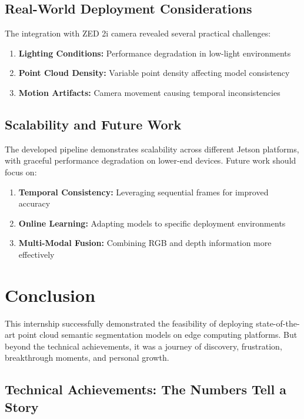 \documentclass[12pt,a4paper]{report}
\begin{document}
\section{Real-World Deployment Considerations}

The integration with ZED 2i camera revealed several practical challenges:

\begin{enumerate}
    \item \textbf{Lighting Conditions:} Performance degradation in low-light environments
    \item \textbf{Point Cloud Density:} Variable point density affecting model consistency
    \item \textbf{Motion Artifacts:} Camera movement causing temporal inconsistencies
\end{enumerate}

\section{Scalability and Future Work}

The developed pipeline demonstrates scalability across different Jetson platforms, with graceful performance degradation on lower-end devices. Future work should focus on:

\begin{enumerate}
    \item \textbf{Temporal Consistency:} Leveraging sequential frames for improved accuracy
    \item \textbf{Online Learning:} Adapting models to specific deployment environments
    \item \textbf{Multi-Modal Fusion:} Combining RGB and depth information more effectively
\end{enumerate}

\chapter{Conclusion}

This internship successfully demonstrated the feasibility of deploying state-of-the-art point cloud semantic segmentation models on edge computing platforms. But beyond the technical achievements, it was a journey of discovery, frustration, breakthrough moments, and personal growth.

\section{Technical Achievements: The Numbers Tell a Story}
\end{document}
